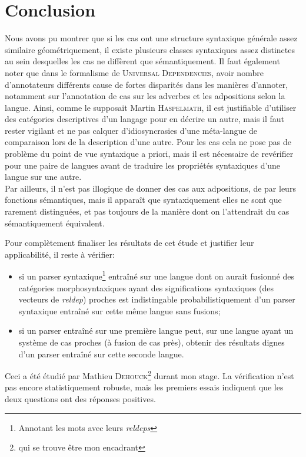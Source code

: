 \documentclass{cours}
\begin{document}
\section{Conclusion}
Nous avons pu montrer que si les cas ont une structure syntaxique générale assez similaire géométriquement, il existe plusieurs classes syntaxiques assez distinctes au sein desquelles les cas ne diffèrent que sémantiquement.
Il faut également noter que dans le formalisme de \textsc{Universal Dependencies}, avoir nombre d'annotateurs différents cause de fortes disparités dans les manières d'annoter, notamment sur l'annotation de cas sur les adverbes et les adpositions selon la langue.
Ainsi, comme le supposait Martin \textsc{Haspelmath}, il est justifiable d'utiliser des catégories descriptives d'un langage pour en décrire un autre, mais il faut rester vigilant et ne pas calquer d'idiosyncrasies d'une méta-langue de comparaison lors de la description d'une autre.
Pour les cas cela ne pose pas de problème du point de vue syntaxique a priori, mais il est nécessaire de revérifier pour une paire de langues avant de traduire les propriétés syntaxiques d'une langue sur une autre.
\\
Par ailleurs, il n'est pas illogique de donner des cas aux adpositions, de par leurs fonctions sémantiques, mais il apparaît que syntaxiquement elles ne sont que rarement distinguées, et pas toujours de la manière dont on l'attendrait du cas sémantiquement équivalent.

\medskip

Pour complètement finaliser les résultats de cet étude et justifier leur applicabilité, il reste à vérifier:
\begin{itemize}
	\item si un parser syntaxique\footnote{Annotant les mots avec leurs \textit{reldeps}} entraîné sur une langue dont on aurait fusionné des catégories morphosyntaxiques ayant des significations syntaxiques (des vecteurs de \textit{reldep}) proches est indistingable probabilistiquement d'un parser syntaxique entraîné sur cette même langue sans fusions;
	\item si un parser entraîné sur une première langue peut, sur une langue ayant un système de cas proches (à fusion de cas près), obtenir des résultats dignes d'un parser entraîné sur cette seconde langue.
\end{itemize}

Ceci a été étudié par Mathieu \textsc{Dehouck}\footnote{qui se trouve être mon encadrant} durant mon stage.
La vérification n'est pas encore statistiquement robuste, mais les premiers essais indiquent que les deux questions ont des réponses positives.


\appendix



\end{document}

